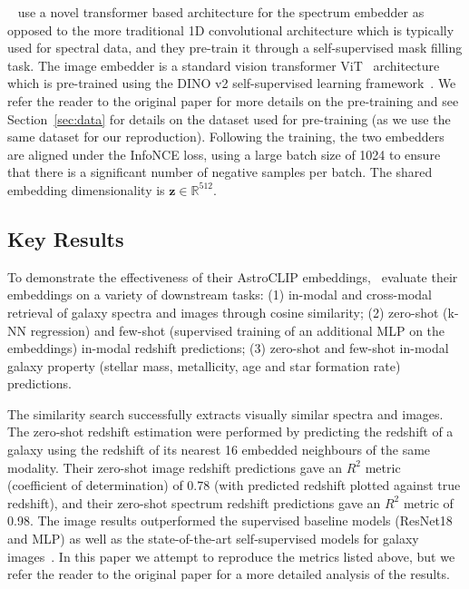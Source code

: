 ~\cite{astroclip} use a novel transformer based architecture for the spectrum embedder as opposed to the more traditional
1D convolutional architecture which is typically used for spectral data, and they pre-train it through a self-supervised
mask filling task.
The image embedder is a standard vision transformer ViT~\citep{dosovitskiy2021} architecture which is pre-trained using
the DINO v2 self-supervised learning framework~\citep{oquab2024}.
We refer the reader to the original paper for more details on the pre-training and see Section~\eqref{sec:data} for details
on the dataset used for pre-training (as we use the same dataset for our reproduction).
Following the training, the two embedders are aligned under the InfoNCE loss, using a large batch size of 1024 to ensure
that there is a significant number of negative samples per batch.
The shared embedding dimensionality is $\mathbf{z} \in \mathbb{R}^{512}$.

\subsection{Key Results}\label{subsec:original-paper-key-results}
To demonstrate the effectiveness of their AstroCLIP embeddings,~\cite{astroclip} evaluate their embeddings on a variety
of downstream tasks: (1) in-modal and cross-modal retrieval of galaxy spectra and images through cosine similarity; (2)
zero-shot (k-NN regression) and few-shot (supervised training of an additional MLP on the embeddings) in-modal redshift
predictions; (3) zero-shot and few-shot in-modal galaxy property (stellar mass, metallicity, age and star formation rate)
predictions.

The similarity search successfully extracts visually similar spectra and images.
The zero-shot redshift estimation were performed by predicting the redshift of a galaxy using the redshift of its nearest
16 embedded neighbours of the same modality.
Their zero-shot image redshift predictions gave an $R^{2}$ metric (coefficient of determination) of 0.78 (with predicted
redshift plotted against true redshift), and their zero-shot spectrum redshift predictions gave an $R^{2}$ metric of 0.98.
The image results outperformed the supervised baseline models (ResNet18 and MLP) as well as the state-of-the-art
self-supervised models for galaxy images~\citep{stein2021}.
In this paper we attempt to reproduce the metrics listed above, but we refer the reader to the original paper for a
more detailed analysis of the results.
